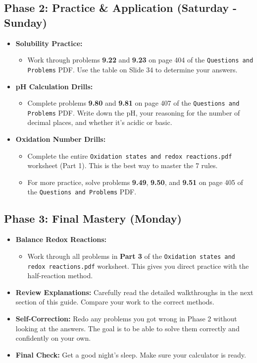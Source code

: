 \documentclass{article}
\begin{document}
\subsection*{Phase 2: Practice \& Application (Saturday - Sunday)}
\begin{itemize}[itemsep=5pt]
    \item \textbf{Solubility Practice:}
    \begin{itemize}
        \item Work through problems \textbf{9.22} and \textbf{9.23} on page 404 of the \texttt{Questions and Problems} PDF. Use the table on Slide 34 to determine your answers.
    \end{itemize}
    \item \textbf{pH Calculation Drills:}
    \begin{itemize}
        \item Complete problems \textbf{9.80} and \textbf{9.81} on page 407 of the \texttt{Questions and Problems} PDF. Write down the pH, your reasoning for the number of decimal places, and whether it's acidic or basic.
    \end{itemize}
    \item \textbf{Oxidation Number Drills:}
    \begin{itemize}
        \item Complete the entire \texttt{Oxidation states and redox reactions.pdf} worksheet (Part 1). This is the best way to master the 7 rules.
        \item For more practice, solve problems \textbf{9.49}, \textbf{9.50}, and \textbf{9.51} on page 405 of the \texttt{Questions and Problems} PDF.
    \end{itemize}
\end{itemize}

\subsection*{Phase 3: Final Mastery (Monday)}
\begin{itemize}[itemsep=5pt]
    \item \textbf{Balance Redox Reactions:}
    \begin{itemize}
        \item Work through all problems in \textbf{Part 3} of the \texttt{Oxidation states and redox reactions.pdf} worksheet. This gives you direct practice with the half-reaction method.
    \end{itemize}
    \item \textbf{Review Explanations:} Carefully read the detailed walkthroughs in the next section of this guide. Compare your work to the correct methods.
    \item \textbf{Self-Correction:} Redo any problems you got wrong in Phase 2 without looking at the answers. The goal is to be able to solve them correctly and confidently on your own.
    \item \textbf{Final Check:} Get a good night's sleep. Make sure your calculator is ready.
\end{itemize}
\newpage
\end{document}
